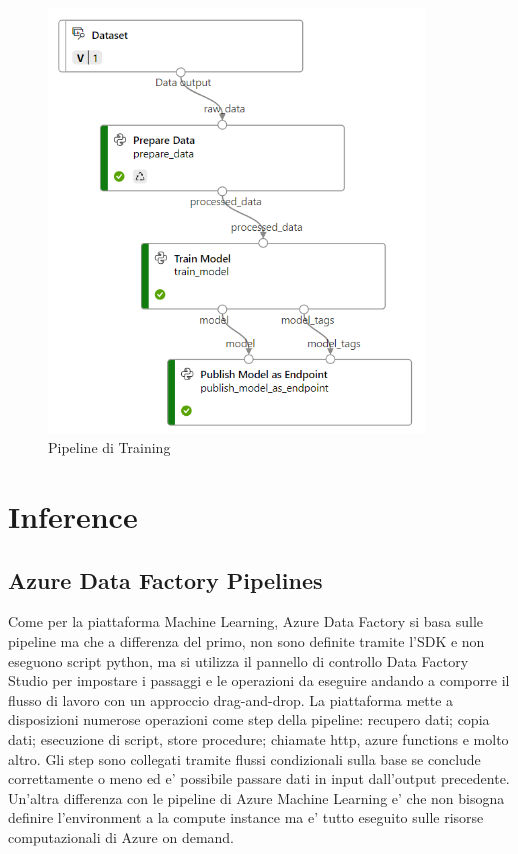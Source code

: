 \begin{figure}[t]
	\centering
	\includegraphics[width=10cm, scale=1]{images/pipeline}
	\caption{Pipeline di Training}
	\label{pipeline-training}
\end{figure}

\section{Inference}
\subsection{Azure Data Factory Pipelines}
Come per la piattaforma Machine Learning, Azure Data Factory si basa sulle pipeline ma che a differenza del primo, non sono definite tramite l'SDK e non eseguono script python, ma si utilizza il pannello di controllo Data Factory Studio per impostare i passaggi e le operazioni da eseguire andando a comporre il flusso di lavoro con un approccio drag-and-drop.
La piattaforma mette a disposizioni numerose operazioni come step della pipeline: recupero dati; copia dati; esecuzione di script, store procedure; chiamate http, azure functions e molto altro. 
Gli step sono collegati tramite flussi condizionali sulla base se conclude correttamente o meno ed e' possibile passare dati in input dall'output precedente.
Un'altra differenza con le pipeline di Azure Machine Learning e' che non bisogna definire l'environment a la compute instance ma e' tutto eseguito sulle risorse computazionali di Azure on demand.
